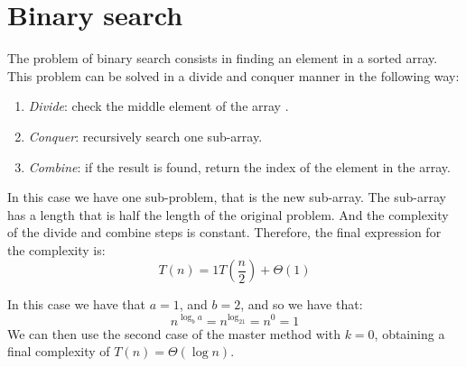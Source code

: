 \section{Binary search}

The problem of binary search consists in finding an element in a sorted array. 
This problem can be solved in a divide and conquer manner in the following way: 
\begin{enumerate}
    \item \textit{Divide}: check the middle element of the array .
    \item \textit{Conquer}: recursively search one sub-array. 
    \item \textit{Combine}: if the result is found, return the index of the element in the array. 
\end{enumerate}
In this case we have one sub-problem, that is the new sub-array. 
The sub-array has a length that is half the length of the original problem. 
And the complexity of the divide and combine steps is constant.
Therefore, the final expression for the complexity is: 
\[T(n)=1T\left(\dfrac{n}{2}\right)+\Theta(1)\]

In this case we have that $a=1$, and $b=2$, and so we have that: 
\[n^{\log_ba}=n^{\log_21}=n^0=1\]
We can then use the second case of the master method with $k=0$, obtaining a final complexity of $T(n)=\Theta(\log n)$. 